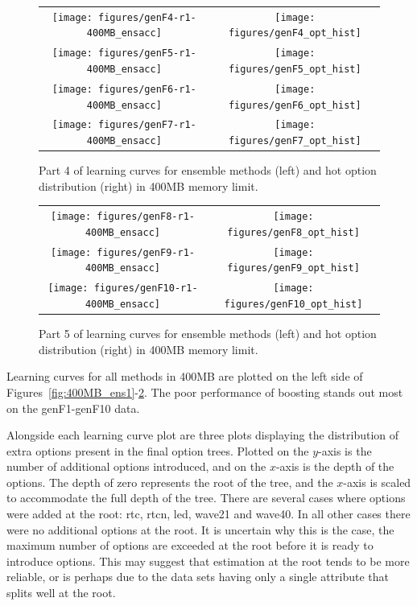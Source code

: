 \begin{figure}
\centering
\begin{tabular}{c@{}c}
\texttt{[image: figures/genF4-r1-400MB\_ensacc]} &
\texttt{[image: figures/genF4\_opt\_hist]} \\
\texttt{[image: figures/genF5-r1-400MB\_ensacc]} &
\texttt{[image: figures/genF5\_opt\_hist]} \\
\texttt{[image: figures/genF6-r1-400MB\_ensacc]} &
\texttt{[image: figures/genF6\_opt\_hist]} \\
\texttt{[image: figures/genF7-r1-400MB\_ensacc]} &
\texttt{[image: figures/genF7\_opt\_hist]} \\
\end{tabular}
\caption{Part 4 of learning curves for ensemble methods (left) and {\sc hot} option distribution (right) in 400MB memory limit.}
\label{fig:400MB_ens4}
\end{figure}

\begin{figure}
\centering
\begin{tabular}{c@{}c}
\texttt{[image: figures/genF8-r1-400MB\_ensacc]} &
\texttt{[image: figures/genF8\_opt\_hist]} \\
\texttt{[image: figures/genF9-r1-400MB\_ensacc]} &
\texttt{[image: figures/genF9\_opt\_hist]} \\
\texttt{[image: figures/genF10-r1-400MB\_ensacc]} &
\texttt{[image: figures/genF10\_opt\_hist]} \\
\end{tabular}
\caption{Part 5 of learning curves for ensemble methods (left) and {\sc hot} option distribution (right) in 400MB memory limit.}
\label{fig:400MB_ens5}
\end{figure}

Learning curves for all methods in 400MB are plotted on the left side of  Figures~\ref{fig:400MB_ens1}-\ref{fig:400MB_ens5}. The poor performance of boosting stands out most on the {\sc genF1}-{\sc genF10} data.

Alongside each learning curve plot are three plots displaying the distribution of extra options present in the final option trees. 
Plotted on the $y$-axis is the number of additional options introduced, and on the $x$-axis is the depth of the options.
The depth of zero represents the root of the tree, and the $x$-axis is scaled to accommodate the full depth of the tree. There are several cases where options were added at the root: {\sc rtc}, {\sc rtcn}, {\sc led}, {\sc wave21} and {\sc wave40}. In all other cases there were no additional options at the root. It is uncertain why this is the case, the maximum number of options are exceeded at the root before it is ready to introduce options. This may suggest that estimation at the root tends to be more reliable, or is perhaps due to the data sets having only a single attribute that splits well at the root.


